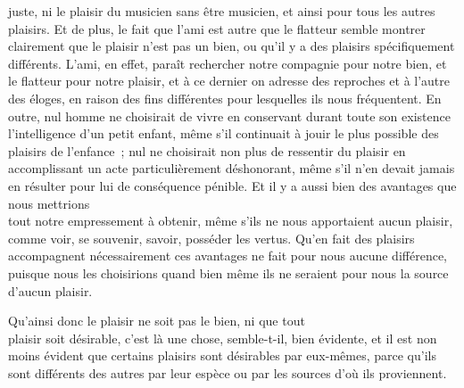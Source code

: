 \documentclass[french,twoside]{book} %
\begin{document}
juste, ni le plaisir du musicien sans être musicien, et ainsi pour tous les autres plaisirs. Et de plus, le fait que l’ami est autre que le flatteur semble montrer clairement que le plaisir n’est pas un bien, ou qu’il y a des plaisirs spécifiquement différents. L’ami, en effet, paraît rechercher notre compagnie pour notre bien, et le flatteur pour notre plaisir, et à ce dernier on adresse des reproches et à l’autre des éloges, en  raison des fins différentes pour lesquelles ils nous fréquentent. En outre, nul homme ne choisirait de vivre en conservant durant toute son existence l’intelligence d’un petit enfant, même s’il continuait à jouir le plus possible des plaisirs de l’enfance ; nul ne choisirait non plus de ressentir du plaisir en accomplissant un acte particulièrement déshonorant, même s’il n’en devait jamais en résulter pour lui de conséquence pénible. Et il y a aussi bien des avantages que nous mettrions \\
tout notre empressement à obtenir, même s’ils ne nous apportaient aucun plaisir, comme voir, se souvenir, savoir, posséder les vertus. Qu’en fait des plaisirs accompagnent nécessairement ces avantages ne fait pour nous aucune différence, puisque nous les choisirions quand bien même ils ne seraient pour nous la source d’aucun plaisir.\par
Qu’ainsi donc le plaisir ne soit pas le bien, ni que tout \\
plaisir soit désirable, c’est là une chose, semble-t-il, bien évidente, et il est non moins évident que certains plaisirs sont désirables par eux-mêmes, parce qu’ils sont différents des autres par leur espèce ou par les sources d’où ils proviennent.
\end{document}
